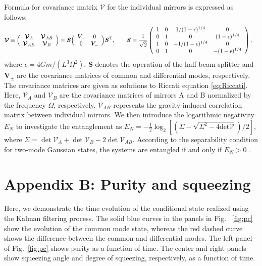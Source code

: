 \documentclass[twocolumn,superscriptaddress,aps,preprintnumbers,amsmath,amssymb,prl,nofootinbib]{revtex4}
\begin{document}
Formula for covariance matrix 
$\bm{\mathcal{V}}$ for the individual mirrors is expressed as follows: 
\begin{eqnarray}
    \bm{\mathcal{V}}&\equiv
    \Bigl(\begin{array}{cc}
\bm{\mathcal{V}}_A&\bm{\mathcal{V}}_{AB}\\
        \bm{\mathcal{V}}_{AB}&\bm{\mathcal{V}}_{B}
    \end{array}\Bigr)
    =\bm{S}
    \Bigl(\begin{array}{cc}
        \bm{V}_+&0
        \label{bmV}
        \\
        0&\bm{V}_{-}
    \end{array}\Bigr)
    \bm{S}^{\text{T}},\qquad
    \bm{S}=\frac{1}{\sqrt{2}}
    \left(\begin{array}{cccc}
            1&0&1/(1-\epsilon)^{1/4}&0\\
        0&1&0&(1-\epsilon)^{1/4}\\
        1&0&-1/(1-\epsilon)^{1/4}&0\\
        0&1&0&-(1-\epsilon)^{1/4}
    \end{array}\right),
\end{eqnarray}
where 
$\epsilon=4Gm/(L^3\Omega^2)$, 
$\bm{S}$ denotes the operation of the half-beam splitter and 
$\bm{V}_\pm$ are the covariance matrices of common and differential modes, respectively. 
The covariance matrices are given as solutions to Riccati equation \eqref{eq:Riccati}.
Here, $\bm{\mathcal{V}}_A$ and $\bm{\mathcal{V}}_B$
are the covariance matrices of mirrors A and B normalized by the frequency $\Omega$, respectively. 
$\bm{\mathcal{V}}_{AB}$ represents the gravity-induced correlation matrix between individual mirrors.
We then introduce the logarithmic negativity $E_N$ to investigate the entanglement as
 $  E_{N}=
    -\frac{1}{2}\log_2\left[{(\Sigma-\sqrt{\Sigma^{2}-4\text{det}\bm{\mathcal{V}}})}/{2}\right]$,
where $\Sigma=\det\bm{\mathcal{V}}_{A}+\det\bm{\mathcal{V}}_{B}-2\det\bm{\mathcal{V}}_{AB}$.
According to the separability condition for two-mode Gaussian states, the systems are entangled if and only if $E_N>0$ \cite{Giedke2001}. 


\section{Appendix B: Purity and squeezing}

Here, we demonstrate the time evolution of the conditional state realized using the Kalman filtering process. The solid blue curves in the panels in Fig. ~\ref{fig:pc} show the evolution of the common mode state, whereas the red dashed curve shows the difference between the common and differential modes.
The left panel of  Fig.~\ref{fig:pc} shows purity as a function of time. 
The center and right panels show 
squeezing angle and degree of squeezing, respectively, as a function of time.
\end{document}
